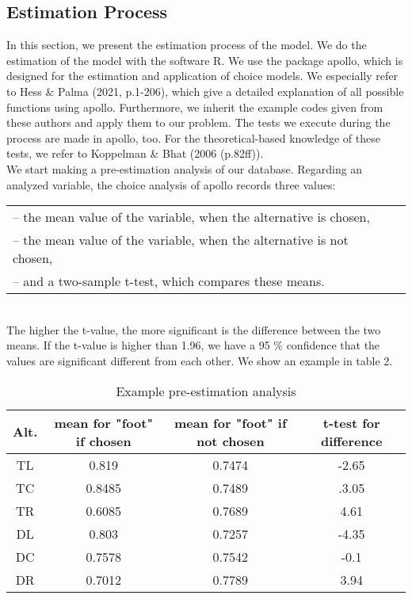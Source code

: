 \documentclass[12pt,dvipsnames]{article}%
\begin{document}
\subsection{Estimation Process}

In this section, we present the estimation process of the model. We do the estimation of the model with the software R. We use the package apollo, which is designed for the estimation and application of choice models. We especially refer to Hess \& Palma (2021, p.1-206), which give a detailed explanation of all possible functions using apollo. Furthermore, we inherit the example codes given from these authors and apply them to our problem. The tests we execute during the process are made in apollo, too. For the theoretical-based knowledge of these tests, we refer to Koppelman \& Bhat (2006 (p.82ff)).   \\
%
We start making a pre-estimation analysis of our database. Regarding an analyzed variable, the choice analysis of apollo records three values:
\begin{tabular}[t]{lr} 
--  the mean value of the variable, when the alternative is chosen, \\ 
-- the mean value of the variable, when the alternative is not chosen, \\ 
-- and a two-sample t-test, which compares these means.  \\
\end{tabular}
 \\


The higher the t-value, the more significant is the difference between the two means. If the t-value is higher than 1.96, we have a 95 \% confidence that the values are significant different from each other.  We show an example in table 2.


 \begin{table}[ht]
\caption{Example pre-estimation analysis}
\centering
\small
\begin{tabular}{ c |  c |  c |  c }
    Alt. & mean for "foot" if chosen  & mean for "foot" if not chosen & t-test for difference  \\
   \hline

TL    &   0.819   & 0.7474   & -2.65  \\

TC    &   0.8485   & 0.7489    & .3.05  \\

TR   &   0.6085   & 0.7689   & 4.61  \\

DL    &   0.803   & 0.7257    & -4.35  \\

DC    &   0.7578   & 0.7542    & -0.1   \\

DR   &   0.7012   & 0.7789   & 3.94  \\

 \end{tabular}
 \end{table}
\end{document}
